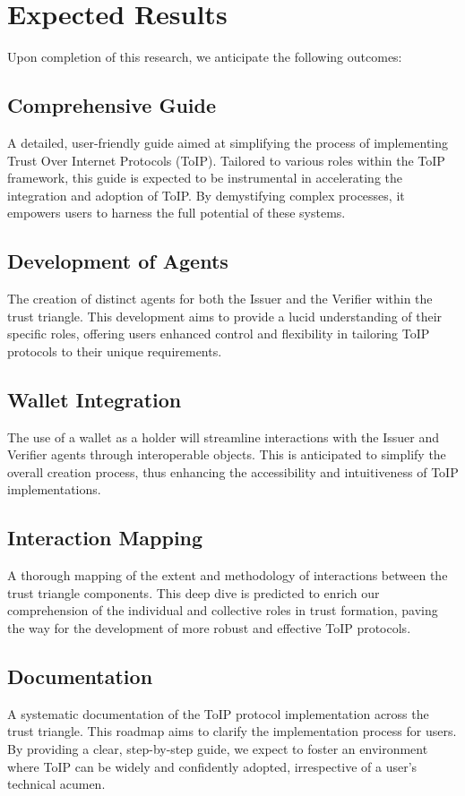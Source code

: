 \section{Expected Results}

Upon completion of this research, we anticipate the following outcomes:

\subsection{Comprehensive Guide}

A detailed, user-friendly guide aimed at simplifying the process of implementing Trust Over Internet Protocols (ToIP). Tailored to various roles within the ToIP framework, this guide is expected to be instrumental in accelerating the integration and adoption of ToIP. By demystifying complex processes, it empowers users to harness the full potential of these systems.

\subsection{Development of Agents}
The creation of distinct agents for both the Issuer and the Verifier within the trust triangle. This development aims to provide a lucid understanding of their specific roles, offering users enhanced control and flexibility in tailoring ToIP protocols to their unique requirements.

\subsection{Wallet Integration}
The use of a wallet as a holder will streamline interactions with the Issuer and Verifier agents through interoperable objects. This is anticipated to simplify the overall creation process, thus enhancing the accessibility and intuitiveness of ToIP implementations.

\subsection{Interaction Mapping}
A thorough mapping of the extent and methodology of interactions between the trust triangle components. This deep dive is predicted to enrich our comprehension of the individual and collective roles in trust formation, paving the way for the development of more robust and effective ToIP protocols.

\subsection{Documentation}
A systematic documentation of the ToIP protocol implementation across the trust triangle. This roadmap aims to clarify the implementation process for users. By providing a clear, step-by-step guide, we expect to foster an environment where ToIP can be widely and confidently adopted, irrespective of a user's technical acumen.
